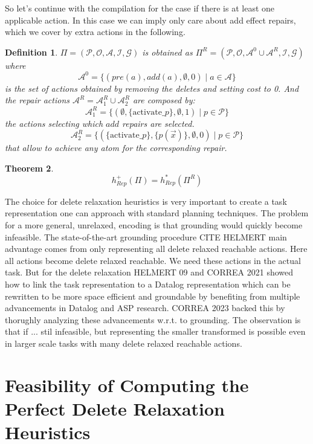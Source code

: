 \documentclass[twocolumn]{article}
\newcommand{\task}{\ensuremath{\Pi}\xspace}
\newcommand{\preds}{\ensuremath{\mathcal{P}}\xspace}
\newcommand{\acts}{\ensuremath{\mathcal{A}}\xspace}
\newcommand{\objects}{\ensuremath{\mathcal{O}}\xspace}
\newcommand{\init}{\ensuremath{\mathcal{I}}\xspace}
\newcommand{\goal}{\ensuremath{\mathcal{G}}\xspace}
\newcommand{\someVar}{\ensuremath{x}\xspace}
\newcommand{\someAtom}{\ensuremath{p(\vec{\someVar})}\xspace}
\newcommand{\somePred}{\ensuremath{p}\xspace}
\newcommand{\prename}{\ensuremath{pre}\xspace}
\newcommand{\addname}{\ensuremath{add}\xspace}
\newcommand{\pre}[1]{\ensuremath{\prename(#1)}\xspace}
\newcommand{\add}[1]{\ensuremath{\addname(#1)}\xspace}
\newcommand{\someAct}{\ensuremath{a}\xspace}
\newcommand{\optimalHeuristic}{\ensuremath{h^{*}_{Rep}}\xspace}
\newcommand{\optimalHeuristicRel}{\ensuremath{h^{+}_{Rep}}\xspace}
\newtheorem{theorem}{Theorem}
\newtheorem{definition}[theorem]{Definition}
\begin{document}
	So let's continue with the compilation for the case if there is at least one applicable action. 
	In this case we can imply only care about add effect repairs, which we cover by extra actions in the following.
	
	\begin{definition}
		
		$\task = (\preds, \objects, \acts, \init, \goal)$
		is obtained as
		$\task^{R} = (\preds, \objects, \acts^0 \cup \acts^{R}, \init, \goal)$
		where 
		$$
		\acts^0 = \{
		(\pre{\someAct}, \add{\someAct}, \emptyset, 0) \mid \someAct \in \acts
		\}
		$$
		is the set of actions obtained by removing the deletes and setting cost to 0.
		And the repair actions $\acts^{R} = \acts^{R}_1 \cup \acts^{R}_2$ are composed by:
		$$
		\acts^{R}_1 = 
		\{
		(\emptyset, \{\text{activate\_}\somePred\}, \emptyset, 1) \mid \somePred \in \preds
		\}
		$$
		the actions selecting which \addname repairs are selected.
		$$
		\acts^{R}_2
		= \{
		(\{\text{activate\_}\somePred\}, \{\someAtom\}, \emptyset, 0) \mid \somePred \in \preds
		\}$$
		that allow to achieve any atom for the corresponding repair.
	\end{definition}
	
	\begin{theorem}
		$$\optimalHeuristicRel(\task) = \optimalHeuristic(\task^{R})$$
	\end{theorem}
	
	\smallskip
	
	The choice for delete relaxation heuristics is very important to create a task representation one can approach with standard planning techniques.
	The problem for a more general, unrelaxed,  encoding is that grounding would quickly become infeasible.
	The state-of-the-art grounding procedure CITE HELMERT main advantage comes from only representing all delete relaxed reachable actions. 
	Here all actions become delete relaxed reachable.
	We need these actions in the actual task.
	But for the delete relaxation HELMERT 09 and CORREA 2021 showed how to link the task representation to a Datalog representation which can be rewritten to be more space efficient and groundable by 
	benefiting from multiple advancements in Datalog and ASP research.
	CORREA 2023 backed this by thorughly analyzing these advancements w.r.t. to grounding.
	The observation is that if ... stil infeasible, but representing the smaller transformed is possible even in larger scale tasks with many delete relaxed reachable actions.
	
	\section{Feasibility of Computing the Perfect Delete Relaxation Heuristics}
	
\end{document}
